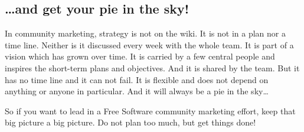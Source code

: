 \subsection*{\dots and get your pie in the sky!}
In community marketing, strategy is not on the wiki. It is not in a plan nor a time line. Neither is it discussed every week with the whole team. It is part of a vision which has grown over time. It is carried by a few central people and inspires the short-term plans and objectives. And it is shared by the team. But it has no time line and it can not fail. It is flexible and does not depend on anything or anyone in particular. And it will always be a pie in the sky\dots

So if you want to lead in a Free Software community marketing effort, keep that big picture a big picture. Do not plan too much, but get things done!

